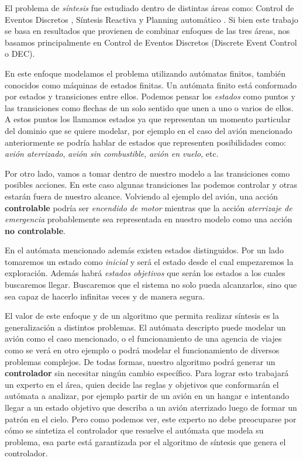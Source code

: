 El problema de \textit{síntesis} fue estudiado dentro de distintas áreas como: Control de Eventos Discretos \cite{DEC}, Síntesis Reactiva \cite{sreac} y Planning automático \cite{paut}. Si bien este trabajo se basa en resultados que provienen de combinar enfoques de las tres áreas, nos basamos principalmente en Control de Eventos Discretos (Discrete Event Control o DEC).

En este enfoque modelamos el problema utilizando autómatas finitos, también conocidos como máquinas de estados finitas. Un autómata finito está conformado por estados y transiciones entre ellos. Podemos pensar los \textit{estados} como puntos y las transiciones como flechas de un solo sentido que unen a uno o varios de ellos. A estos puntos los llamamos estados ya que representan un momento particular del dominio que se quiere modelar, por ejemplo en el caso del avión mencionado anteriormente se podría hablar de estados que representen posibilidades como: \textit{avión aterrizado}, \textit{avión sin combustible}, \textit{avión en vuelo}, etc.

Por otro lado, vamos a tomar dentro de nuestro modelo a las transiciones como posibles acciones. En este caso algunas transiciones las podemos controlar y otras estarán fuera de nuestro alcance. Volviendo al ejemplo del avión, una acción \textbf{controlable} podría ser \textit{encendido de motor} mientras que la acción \textit{aterrizaje de emergencia} probablemente sea representada en nuestro modelo como una acción \textbf{no controlable}.

En el autómata mencionado además existen estados distinguidos. Por un lado tomaremos un estado como \textit{inicial} y será el estado desde el cual empezaremos la exploración. Además habrá \textit{estados objetivos} que serán los estados a los cuales buscaremos llegar. Buscaremos que el sistema no solo pueda alcanzarlos, sino que sea capaz de hacerlo infinitas veces y de manera segura.

El valor de este enfoque y de un algoritmo que permita realizar síntesis es la generalización a distintos problemas. El autómata descripto puede modelar un avión como el caso mencionado, o el funcionamiento de una agencia de viajes como se verá en otro ejemplo o podrá modelar el funcionamiento de diversos problemas complejos. De todas formas, nuestro algoritmo podrá generar un \textbf{controlador} sin necesitar ningún cambio específico. Para lograr esto trabajará un experto en el área, quien decide las reglas y objetivos que conformarán el autómata a analizar, por ejemplo partir de un avión en un hangar e intentando llegar a un estado objetivo que describa a un avión aterrizado luego de formar un patrón en el cielo. Pero como podemos ver, este experto no debe preocuparse por cómo se sintetiza el controlador que resuelve el autómata que modela su problema, esa parte está garantizada por el algoritmo de síntesis que genera el controlador.

